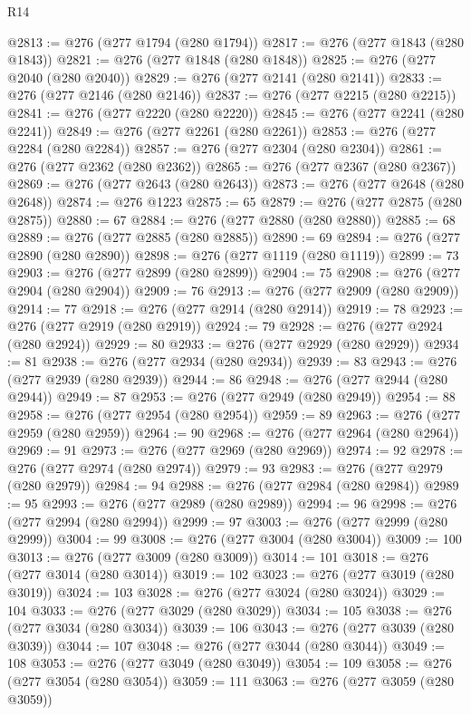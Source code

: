 \begin{lexlean}{R14}
\begin{coremodule}
@2813 := @276 (@277 @1794 (@280 @1794))
@2817 := @276 (@277 @1843 (@280 @1843))
@2821 := @276 (@277 @1848 (@280 @1848))
@2825 := @276 (@277 @2040 (@280 @2040))
@2829 := @276 (@277 @2141 (@280 @2141))
@2833 := @276 (@277 @2146 (@280 @2146))
@2837 := @276 (@277 @2215 (@280 @2215))
@2841 := @276 (@277 @2220 (@280 @2220))
@2845 := @276 (@277 @2241 (@280 @2241))
@2849 := @276 (@277 @2261 (@280 @2261))
@2853 := @276 (@277 @2284 (@280 @2284))
@2857 := @276 (@277 @2304 (@280 @2304))
@2861 := @276 (@277 @2362 (@280 @2362))
@2865 := @276 (@277 @2367 (@280 @2367))
@2869 := @276 (@277 @2643 (@280 @2643))
@2873 := @276 (@277 @2648 (@280 @2648))
@2874 := @276 @1223
@2875 := 65
@2879 := @276 (@277 @2875 (@280 @2875))
@2880 := 67
@2884 := @276 (@277 @2880 (@280 @2880))
@2885 := 68
@2889 := @276 (@277 @2885 (@280 @2885))
@2890 := 69
@2894 := @276 (@277 @2890 (@280 @2890))
@2898 := @276 (@277 @1119 (@280 @1119))
@2899 := 73
@2903 := @276 (@277 @2899 (@280 @2899))
@2904 := 75
@2908 := @276 (@277 @2904 (@280 @2904))
@2909 := 76
@2913 := @276 (@277 @2909 (@280 @2909))
@2914 := 77
@2918 := @276 (@277 @2914 (@280 @2914))
@2919 := 78
@2923 := @276 (@277 @2919 (@280 @2919))
@2924 := 79
@2928 := @276 (@277 @2924 (@280 @2924))
@2929 := 80
@2933 := @276 (@277 @2929 (@280 @2929))
@2934 := 81
@2938 := @276 (@277 @2934 (@280 @2934))
@2939 := 83
@2943 := @276 (@277 @2939 (@280 @2939))
@2944 := 86
@2948 := @276 (@277 @2944 (@280 @2944))
@2949 := 87
@2953 := @276 (@277 @2949 (@280 @2949))
@2954 := 88
@2958 := @276 (@277 @2954 (@280 @2954))
@2959 := 89
@2963 := @276 (@277 @2959 (@280 @2959))
@2964 := 90
@2968 := @276 (@277 @2964 (@280 @2964))
@2969 := 91
@2973 := @276 (@277 @2969 (@280 @2969))
@2974 := 92
@2978 := @276 (@277 @2974 (@280 @2974))
@2979 := 93
@2983 := @276 (@277 @2979 (@280 @2979))
@2984 := 94
@2988 := @276 (@277 @2984 (@280 @2984))
@2989 := 95
@2993 := @276 (@277 @2989 (@280 @2989))
@2994 := 96
@2998 := @276 (@277 @2994 (@280 @2994))
@2999 := 97
@3003 := @276 (@277 @2999 (@280 @2999))
@3004 := 99
@3008 := @276 (@277 @3004 (@280 @3004))
@3009 := 100
@3013 := @276 (@277 @3009 (@280 @3009))
@3014 := 101
@3018 := @276 (@277 @3014 (@280 @3014))
@3019 := 102
@3023 := @276 (@277 @3019 (@280 @3019))
@3024 := 103
@3028 := @276 (@277 @3024 (@280 @3024))
@3029 := 104
@3033 := @276 (@277 @3029 (@280 @3029))
@3034 := 105
@3038 := @276 (@277 @3034 (@280 @3034))
@3039 := 106
@3043 := @276 (@277 @3039 (@280 @3039))
@3044 := 107
@3048 := @276 (@277 @3044 (@280 @3044))
@3049 := 108
@3053 := @276 (@277 @3049 (@280 @3049))
@3054 := 109
@3058 := @276 (@277 @3054 (@280 @3054))
@3059 := 111
@3063 := @276 (@277 @3059 (@280 @3059))

\end{coremodule}
\end{lexlean}

